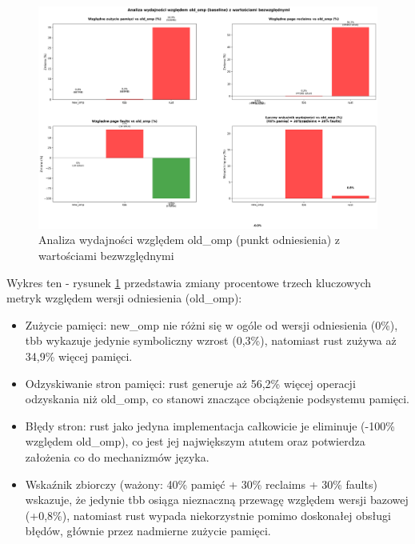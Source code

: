 \begin{figure}[H]
    \centering
    \includegraphics[width=\textwidth]{analiza/images/parallel/is/chart_05_performance_ratios.png}
    \caption{Analiza wydajności względem old\_omp (punkt odniesienia) z wartościami bezwzględnymi}
    \label{is_analiza_wzgledem_old_omp}
\end{figure}
Wykres ten - rysunek \ref{is_analiza_wzgledem_old_omp} przedstawia zmiany procentowe trzech kluczowych metryk względem wersji odniesienia (old\_omp):
\begin{itemize}
    \item Zużycie pamięci: new\_omp nie różni się w ogóle od wersji odniesienia (0\%), tbb wykazuje jedynie symboliczny wzrost (0,3\%), natomiast rust zużywa aż 34,9\% więcej pamięci.
    \item Odzyskiwanie stron pamięci: rust generuje aż 56,2\% więcej operacji odzyskania niż old\_omp, co stanowi znaczące obciążenie podsystemu pamięci.
    \item Błędy stron: rust jako jedyna implementacja całkowicie je eliminuje (-100\% względem old\_omp), co jest jej największym atutem oraz potwierdza założenia co do mechanizmów języka.
    \item Wskaźnik zbiorczy (ważony: 40\% pamięć + 30\% reclaims + 30\% faults) wskazuje, że jedynie tbb osiąga nieznaczną przewagę względem wersji bazowej (+0,8\%), natomiast rust wypada niekorzystnie pomimo doskonałej obsługi błędów, głównie przez nadmierne zużycie pamięci.
\end{itemize}



